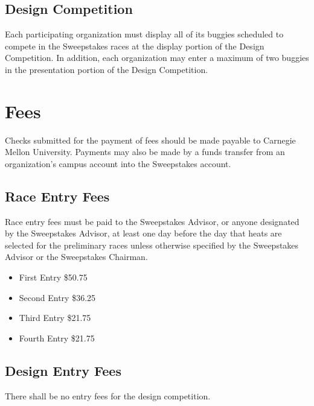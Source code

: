 \subsection{Design Competition}

	Each participating organization must display all of its buggies scheduled to
	compete in the Sweepstakes races at the display portion of the Design
	Competition. In addition, each organization may enter a maximum of two buggies
	in the presentation portion of the Design Competition.

\section{Fees}

	Checks submitted for the payment of fees should be made payable to Carnegie
	Mellon University. Payments may also be made by a funds transfer from an
	organization's campus account into the Sweepstakes account.

\subsection{Race Entry Fees}

	Race entry fees must be paid to the Sweepstakes Advisor, or anyone designated
	by the Sweepstakes Advisor, at least one day before the day that heats are
	selected for the preliminary races unless otherwise specified by the Sweepstakes Advisor 
	or the Sweepstakes Chairman.

	\begin{itemize}
		\item First Entry \$50.75
		\item Second Entry \$36.25
		\item Third Entry \$21.75
		\item Fourth Entry \$21.75
	\end{itemize}

\subsection{Design Entry Fees}

	There shall be no entry fees for the design competition.


